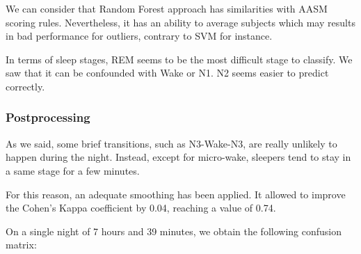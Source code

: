 \documentclass[12pt]{report}
\begin{document}
We can consider that Random Forest approach has similarities with AASM scoring rules. Nevertheless, it has an ability to average subjects which may results in bad performance for outliers, contrary to SVM for instance.

In terms of sleep stages, REM seems to be the most difficult stage to classify. We saw that it can be confounded with Wake or N1.  N2 seems easier to predict correctly.


\subsubsection{Postprocessing}

As we said, some brief transitions, such as N3-Wake-N3, are really unlikely to happen during the night. Instead, except for micro-wake, sleepers tend to stay in a same stage for a few minutes.

For this reason, an adequate smoothing has been applied. It allowed to improve the Cohen's Kappa coefficient by 0.04, reaching a value of 0.74.

On a single night of 7 hours and 39 minutes, we obtain the following confusion matrix:
\end{document}
